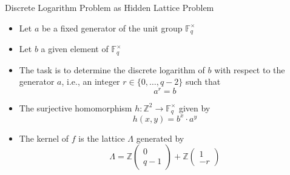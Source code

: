 \documentclass{beamer}
\newcommand{\Q}{\mathbb{Q}}
\newcommand{\Z}{\mathbb{Z}}
\newcommand{\cO}{\mathcal{O}}
\renewcommand{\>}{\rangle}
\newcommand{\<}{\langle}
\begin{document}

\begin{frame}{Discrete Logarithm Problem as Hidden Lattice Problem}

\begin{itemize}
\item Let $a$ be a fixed generator of the unit group $\mathbb{F}_q^\times$ 

\medskip
\item Let $b$ a given element of $\mathbb{F}_q^\times$

\medskip
\item The task is to determine the discrete logarithm of $b$ with respect to the generator $a$, i.e., an integer $r\in\{0,\ldots,q-2\}$ such that 
\[
a^r=b
\]

\item The surjective homomorphism $h : \Z^2 \rightarrow \mathbb{F}_q^\times$ given by
\[
h(x,y)=b^x \cdot a^y
\]

\item The kernel of $f$ is the lattice $\Lambda$ generated by
\[
\Lambda = \Z \left(\begin{array}{c}0\\q-1\end{array}\right) + \Z \left(\begin{array}{c}1\\-r\end{array}\right)
\]
\end{itemize}
\end{frame}





\end{document}
